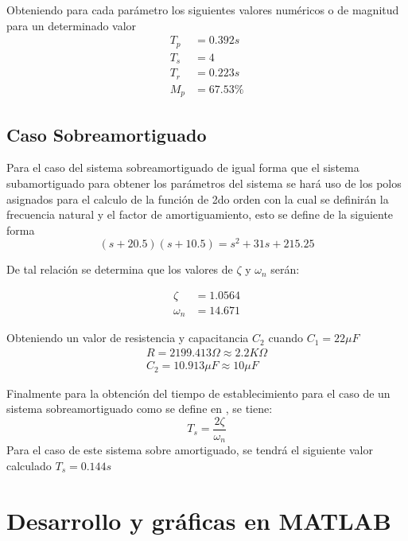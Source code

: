 \documentclass[conference]{IEEEtran}
\begin{document}
	Obteniendo para cada parámetro los siguientes valores numéricos o de magnitud para un determinado valor
	\begin{align}
		T_p &= 0.392s \\
		T_s &= 4 \\
		T_r &= 0.223s \\
		M_p &= 67.53\%
	\end{align}
	
	
	\subsection{Caso Sobreamortiguado}
	Para el caso del sistema sobreamortiguado de igual forma que el sistema subamortiguado para obtener los parámetros del sistema se hará uso de los polos asignados para el calculo de la función de 2do orden con la cual se definirán la frecuencia natural y el factor de amortiguamiento, esto se define de la siguiente forma
	\begin{equation}
		(s + 20.5)(s + 10.5) = s^2 + 31s + 215.25
		\label{eq:sobreamortiguado}
	\end{equation}
	
	De tal relación se determina que los valores de $\zeta$ y $\omega_n$ serán:
	
	\begin{align}
		\zeta &= 1.0564 \\
		\omega_n &= 14.671 
	\end{align}
	
	Obteniendo un valor de resistencia y capacitancia $C_2$ cuando $C_1 = 22 \mu F \label{eq:sobre-capacitancia-c1}$ 
	\begin{align}
		R = 2199.413 \Omega \approx 2.2K \Omega \label{eq:sobre-resistencia}\\ 
		C_2 = 10.913 \mu F \approx 10 \mu F \label{eq:sobre-capacitancia-c2}
	\end{align}	
	
	Finalmente para la obtención del tiempo de establecimiento para el caso de un sistema sobreamortiguado como se define en \cite{sistemas_segundo_orden}, se tiene:
	\begin{equation}
		T_s = \frac{2\zeta}{\omega_n}
		\label{eq:ts-sobreamortiguada}
	\end{equation}
	Para el caso de este sistema sobre amortiguado, se tendrá el siguiente valor calculado 
	$ T_s = 0.144s$ 
	
	\section{Desarrollo y gráficas en MATLAB}
\end{document}
